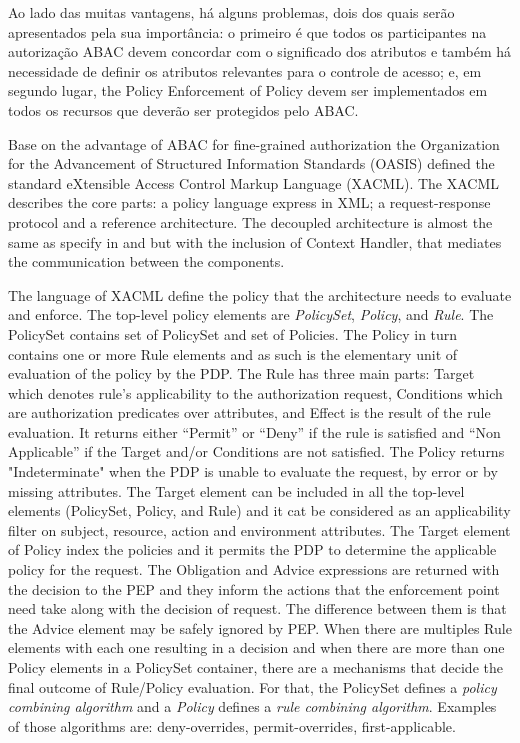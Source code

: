 \documentclass{doublecol-new}
\begin{document}
Ao lado das muitas vantagens, há alguns problemas, dois dos quais serão apresentados pela sua importância: o primeiro é que todos os participantes na autorização ABAC devem concordar com o significado dos atributos \citep{karp2010abac,Rubio-Medrano2015federated} e também há necessidade de definir os atributos relevantes para o controle de acesso; e, em segundo lugar, the Policy Enforcement of Policy devem ser implementados em todos os recursos que deverão ser protegidos pelo ABAC.

Base on the advantage of ABAC for fine-grained authorization the Organization for the Advancement of Structured Information Standards (OASIS) defined the standard eXtensible Access Control Markup Language (XACML)\cite{rissanen2013extensible}. The XACML describes the core parts: a policy language express in XML; a request-response protocol and a reference architecture. The decoupled architecture is almost the same as specify in \cite{huABAC2014guide} and \cite{itut1996acframework} but with the inclusion of Context Handler, that mediates the communication between the components.

The language of XACML define the policy that the architecture needs to evaluate and enforce. The top-level policy elements are \textit{PolicySet}, \textit{Policy}, and \textit{Rule}. The PolicySet contains set of PolicySet and set of Policies. The Policy in turn contains one or more Rule elements and as such is the elementary unit of evaluation of the policy by the PDP. The Rule has three main parts: Target which denotes rule’s applicability to the authorization request, Conditions which are authorization predicates over attributes, and Effect is the result of the rule evaluation. It returns either “Permit” or “Deny” if the rule is satisfied and “Non Applicable” if the Target and/or Conditions are not satisfied. The Policy returns "Indeterminate" when the PDP is unable to evaluate the request, by error or by missing attributes. The Target element can be included in all the top-level elements (PolicySet, Policy, and Rule) and it cat be considered as an applicability filter on subject, resource, action and environment attributes. The Target element of Policy index the policies and it permits the PDP to determine the applicable policy for the request. The Obligation and Advice expressions are returned with the decision to the PEP and they inform the actions that the enforcement point need take along with the decision of request. The difference between them is that the Advice element may be safely ignored by PEP. When there are multiples Rule elements with each one resulting in a decision and when there are more than one Policy elements in a PolicySet container, there are a mechanisms that decide the final outcome of Rule/Policy evaluation. For that, the PolicySet defines a \textit{policy combining algorithm} and a \textit{Policy} defines a \textit{rule combining algorithm}. Examples of those algorithms are: deny-overrides, permit-overrides, first-applicable.
	
\end{document}
